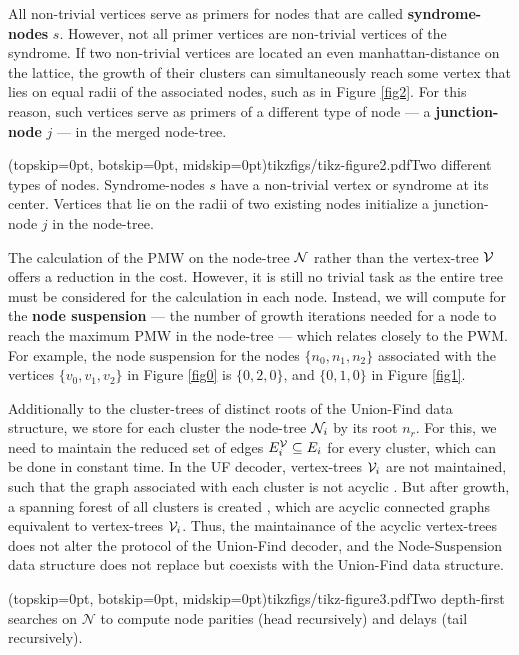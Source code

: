 All non-trivial vertices serve as primers for nodes that are called \textbf{syndrome-nodes} $s$. However, not all primer vertices are non-trivial vertices of the syndrome. If two non-trivial vertices are located an even manhattan-distance on the lattice, the growth of their clusters can simultaneously reach some vertex that lies on equal radii of the associated nodes, such as in Figure \ref{fig2}. For this reason, such vertices serve as primers of a different type of node --- a \textbf{junction-node} $j$ --- in the merged node-tree. 

\Figure[htb](topskip=0pt, botskip=0pt, midskip=0pt){tikzfigs/tikz-figure2.pdf}{Two different types of nodes. Syndrome-nodes $s$ have a non-trivial vertex or syndrome at its center. Vertices that lie on the radii of two existing nodes initialize a junction-node $j$ in the node-tree.\label{fig2}}

The calculation of the PMW on the node-tree $\mathcal{N}$ rather than the vertex-tree $\mathcal{V}$ offers a reduction in the cost. However, it is still no trivial task as the entire tree must be considered for the calculation in each node. Instead, we will compute for the \textbf{node suspension} --- the number of growth iterations needed for a node to reach the maximum PMW in the node-tree --- which relates closely to the PWM. For example, the node suspension for the nodes $\{n_0, n_1, n_2\}$ associated with the vertices $\{v_0, v_1, v_2\}$ in Figure \ref{fig0} is $\{0, 2, 0\}$, and $\{0, 1, 0\}$ in Figure \ref{fig1}.

Additionally to the cluster-trees of distinct roots of the Union-Find data structure, we store for each cluster the node-tree $\mathcal{N}_i$ by its root $n_r$. For this, we need to maintain the reduced set of edges $E^{\mathcal{V}}_i \subseteq E_i$ for every cluster, which can be done in constant time. In the UF decoder, vertex-trees $\mathcal{V}_i$ are not maintained, such that the graph associated with each cluster is not acyclic \cite{delfosse2017almost}. But after growth, a spanning forest of all clusters is created \cite{delfosse2017linear}, which are acyclic connected graphs equivalent to vertex-trees $\mathcal{V}_i$. Thus, the maintainance of the acyclic vertex-trees does not alter the protocol of the Union-Find decoder, and the Node-Suspension data structure does not replace but coexists with the Union-Find data structure. 

\Figure[b](topskip=0pt, botskip=0pt, midskip=0pt){tikzfigs/tikz-figure3.pdf}{Two depth-first searches on $\mathcal{N}$ to compute node parities (head recursively) and delays (tail recursively).\label{fig3}}


